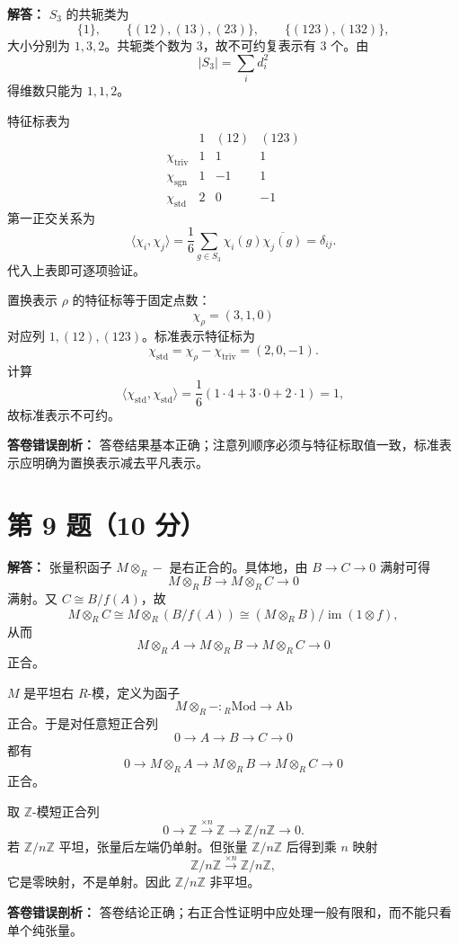\documentclass[11pt]{article}
\begin{document}
\textbf{解答：}
\(S_3\) 的共轭类为
\[
  \{1\},\qquad \{(12),(13),(23)\},\qquad \{(123),(132)\},
\]
大小分别为 \(1,3,2\)。共轭类个数为 \(3\)，故不可约复表示有 \(3\) 个。由
\[
  |S_3|=\sum_i d_i^2
\]
得维数只能为 \(1,1,2\)。

特征标表为
\[
\begin{array}{c|ccc}
 & 1 & (12) & (123)\\
\hline
\chi_{\mathrm{triv}}&1&1&1\\
\chi_{\mathrm{sgn}}&1&-1&1\\
\chi_{\mathrm{std}}&2&0&-1
\end{array}
\]
第一正交关系为
\[
  \langle\chi_i,\chi_j\rangle
  =
  \frac1{6}\sum_{g\in S_3}\chi_i(g)\overline{\chi_j(g)}
  =
  \delta_{ij}.
\]
代入上表即可逐项验证。

置换表示 \(\rho\) 的特征标等于固定点数：
\[
  \chi_\rho=(3,1,0)
\]
对应列 \(1,(12),(123)\)。标准表示特征标为
\[
  \chi_{\mathrm{std}}=\chi_\rho-\chi_{\mathrm{triv}}=(2,0,-1).
\]
计算
\[
  \langle\chi_{\mathrm{std}},\chi_{\mathrm{std}}\rangle
  =
  \frac16(1\cdot4+3\cdot0+2\cdot1)=1,
\]
故标准表示不可约。

\textbf{答卷错误剖析：}
答卷结果基本正确；注意列顺序必须与特征标取值一致，标准表示应明确为置换表示减去平凡表示。

\section*{第 9 题（10 分）}

\textbf{解答：}
张量积函子 \(M\otimes_R-\) 是右正合的。具体地，由 \(B\to C\to0\) 满射可得
\[
  M\otimes_R B\to M\otimes_R C\to0
\]
满射。又 \(C\cong B/f(A)\)，故
\[
  M\otimes_R C\cong M\otimes_R(B/f(A))
  \cong (M\otimes_R B)/\operatorname{im}(1\otimes f),
\]
从而
\[
  M\otimes_R A\to M\otimes_R B\to M\otimes_R C\to0
\]
正合。

\(M\) 是平坦右 \(R\)-模，定义为函子
\[
  M\otimes_R-:{}_R\mathrm{Mod}\to\mathrm{Ab}
\]
正合。于是对任意短正合列
\[
  0\to A\to B\to C\to0
\]
都有
\[
  0\to M\otimes_R A\to M\otimes_R B\to M\otimes_R C\to0
\]
正合。

取 \(\mathbb Z\)-模短正合列
\[
  0\to\mathbb Z\xrightarrow{\times n}\mathbb Z\to\mathbb Z/n\mathbb Z\to0.
\]
若 \(\mathbb Z/n\mathbb Z\) 平坦，张量后左端仍单射。但张量 \(\mathbb Z/n\mathbb Z\) 后得到乘 \(n\) 映射
\[
  \mathbb Z/n\mathbb Z\xrightarrow{\times n}\mathbb Z/n\mathbb Z,
\]
它是零映射，不是单射。因此 \(\mathbb Z/n\mathbb Z\) 非平坦。

\textbf{答卷错误剖析：}
答卷结论正确；右正合性证明中应处理一般有限和，而不能只看单个纯张量。
\end{document}
